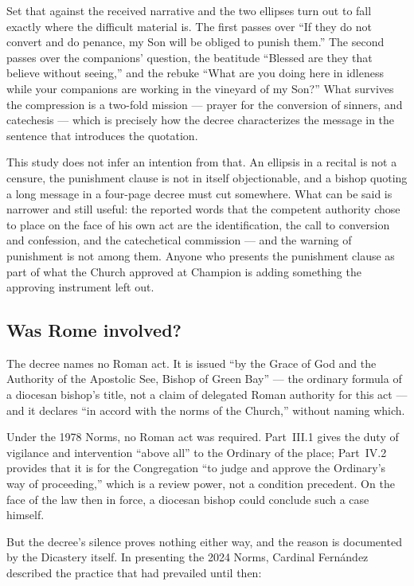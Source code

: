 Set that against the received narrative and the two ellipses turn out
to fall exactly where the difficult material is. The first passes over
``If they do not convert and do penance, my Son will be obliged to
punish them.'' The second passes over the companions' question, the
beatitude ``Blessed are they that believe without seeing,'' and the
rebuke ``What are you doing here in idleness while your companions are
working in the vineyard of my Son?'' What survives the compression is a
two-fold mission --- prayer for the conversion of sinners, and
catechesis --- which is precisely how the decree characterizes the
message in the sentence that introduces the quotation.

This study does not infer an intention from that. An ellipsis in a
recital is not a censure, the punishment clause is not in itself
objectionable, and a bishop quoting a long message in a four-page
decree must cut somewhere. What can be said is narrower and still
useful: the reported words that the competent authority chose to place
on the face of his own act are the identification, the call to
conversion and confession, and the catechetical commission --- and the
warning of punishment is not among them. Anyone who presents the
punishment clause as part of what the Church approved at Champion is
adding something the approving instrument left out.

\subsection{Was Rome involved?}

The decree names no Roman act. It is issued ``by the Grace of God and
the Authority of the Apostolic See, Bishop of Green Bay'' --- the
ordinary formula of a diocesan bishop's title, not a claim of delegated
Roman authority for this act --- and it declares ``in accord with the
norms of the Church,'' without naming which.

Under the 1978 Norms, no Roman act was required. Part~III.1 gives the
duty of vigilance and intervention ``above all'' to the Ordinary of the
place; Part~IV.2 provides that it is for the Congregation ``to judge
and approve the Ordinary's way of proceeding,'' which is a review
power, not a condition precedent. On the face of the law then in force,
a diocesan bishop could conclude such a case himself.

But the decree's silence proves nothing either way, and the reason is
documented by the Dicastery itself. In presenting the 2024 Norms,
Cardinal Fern\'andez described the practice that had prevailed until
then:

